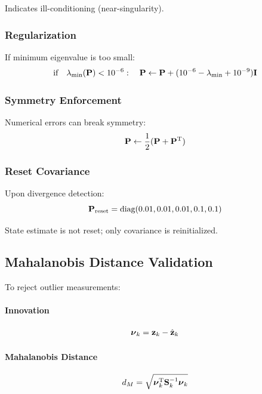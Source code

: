 Indicates ill-conditioning (near-singularity).

\subsubsection{Regularization}

If minimum eigenvalue is too small:
\begin{equation}
\text{if} \quad \lambda_{\min}(\mathbf{P}) < 10^{-6}: \quad \mathbf{P} \leftarrow \mathbf{P} + (10^{-6} - \lambda_{\min} + 10^{-9}) \mathbf{I}
\label{eq:regularization}
\end{equation}

\subsubsection{Symmetry Enforcement}

Numerical errors can break symmetry:
\begin{equation}
\mathbf{P} \leftarrow \frac{1}{2}(\mathbf{P} + \mathbf{P}^\mathrm{T})
\label{eq:symmetry_enforcement}
\end{equation}

\subsubsection{Reset Covariance}

Upon divergence detection:
\begin{equation}
\mathbf{P}_{\text{reset}} = \text{diag}(0.01, 0.01, 0.01, 0.1, 0.1)
\label{eq:reset_covariance}
\end{equation}

State estimate is not reset; only covariance is reinitialized.

\subsection{Mahalanobis Distance Validation}

To reject outlier measurements:

\paragraph{Innovation}
\begin{equation}
\boldsymbol{\nu}_k = \mathbf{z}_k - \hat{\mathbf{z}}_k
\label{eq:innovation}
\end{equation}

\paragraph{Mahalanobis Distance}
\begin{equation}
d_M = \sqrt{\boldsymbol{\nu}_k^\mathrm{T} \mathbf{S}_k^{-1} \boldsymbol{\nu}_k}
\label{eq:mahalanobis}
\end{equation}


